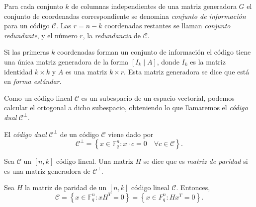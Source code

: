 \begin{definition}
  Para cada conjunto \(k\) de columnas independientes de una matriz generadora \(G\) el conjunto de coordenadas correspondiente se denomina \textit{conjunto de información} para un código \(\mathcal C\). Las \(r = n - k\) coordenadas restantes se llaman \textit{conjunto redundante}, y el número \(r\), la \textit{redundancia} de \(\mathcal C\).
\end{definition}

Si las primeras \(k\) coordenadas forman un conjunto de información el código tiene una única matriz generadora de la forma \([I_k \mid A]\), donde \(I_k\) es la matriz identidad \(k \times k\) y \(A\) es una matriz \(k \times r\). Esta matriz generadora se dice que está en \textit{forma estándar}.


Como un código lineal \(\mathcal C\) es un subespacio de un espacio vectorial, podemos calcular el ortogonal a dicho subespacio, obteniendo lo que llamaremos el \textit{código dual} \(\mathcal C^{\perp}\).

\begin{definition}
  El \textit{código dual} \(\mathcal C^{\perp}\) de un código \(\mathcal C\) viene dado por \[\mathcal C^{\perp} = \left\{x \in \mathbb F_q^n : x \cdot c = 0 \quad \forall c \in \mathcal C\right\}.\]
\end{definition}

\begin{definition}
  Sea \(\mathcal C\) un \([n, k]\) código lineal. Una matriz \(H\) se dice que es \textit{matriz de paridad} si es una matriz generadora de \(\mathcal C^{\perp}\).
\end{definition}

\begin{proposition}
  Sea \(H\) la matriz de paridad de un \([n, k]\) código lineal \(\mathcal C\). Entonces, \[\mathcal C = \left\{x \in \mathbb F_q^n : xH^T = 0\right\} = \left\{x \in F_q^n : Hx^T = 0\right\}.\]
\end{proposition}


